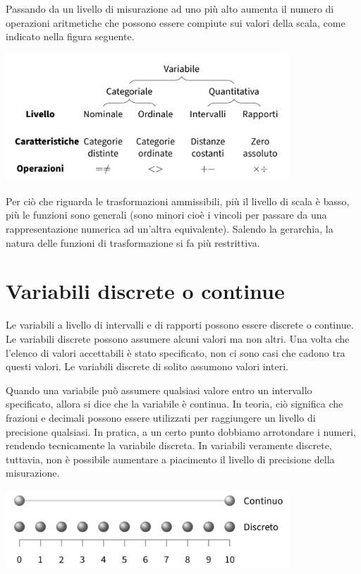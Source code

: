 \documentclass[
]{memoir}
\theoremstyle{definition}
\theoremstyle{definition}
\theoremstyle{definition}
\theoremstyle{definition}
\theoremstyle{remark}
\begin{document}
Passando da un livello di misurazione ad uno più alto aumenta il numero di operazioni aritmetiche che possono essere compiute sui valori della scala, come indicato nella figura seguente.

\includegraphics[width=0.8\textwidth,height=\textheight]{images/misurazione_1.png}

Per ciò che riguarda le trasformazioni ammissibili, più il livello di
scala è basso, più le funzioni sono generali (sono minori cioè i vincoli
per passare da una rappresentazione numerica ad un'altra equivalente).
Salendo la gerarchia, la natura delle funzioni di trasformazione si fa
più restrittiva.

\hypertarget{variabili-discrete-o-continue}{%
\section{Variabili discrete o continue}\label{variabili-discrete-o-continue}}

Le variabili a livello di intervalli e di rapporti possono essere
discrete o continue. Le variabili discrete possono assumere alcuni
valori ma non altri. Una volta che l'elenco di valori accettabili è
stato specificato, non ci sono casi che cadono tra questi valori.
Le variabili discrete di solito assumono valori interi.

Quando una variabile può assumere qualsiasi valore entro un intervallo
specificato, allora si dice che la variabile è continua. In teoria, ciò
significa che frazioni e decimali possono essere utilizzati per
raggiungere un livello di precisione qualsiasi. In pratica, a un certo
punto dobbiamo arrotondare i numeri, rendendo tecnicamente la variabile
discreta. In variabili veramente discrete, tuttavia, non è possibile
aumentare a piacimento il livello di precisione della misurazione.

\includegraphics[width=0.8\textwidth,height=\textheight]{images/misurazione_3.png}
\end{document}

